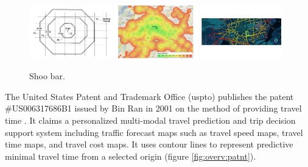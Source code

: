     \begin{figure}[ht]
      {\includegraphics[width=0.32\textwidth]{./img/overv-patnt.png}}
      \hfill
      {\includegraphics[width=0.32\textwidth]{./img/overv-berln.png}}
      \hfill
      {\includegraphics[width=0.32\textwidth]{./img/overv-potsd.png}}
      \caption{Shoo bar.}
      \label{fig:overv:2}
    \end{figure}

    The United States Patent and Trademark Office (\acrshort{uspto}) publishes
    the patent \#US006317686B1 issued by Bin Ran in 2001 on the method of
    providing travel time \cite{ran2001method}. It claims a personalized
    multi-modal travel prediction and trip decision support system including
    traffic forecast maps such as travel speed maps, travel time maps, and
    travel cost maps. It uses contour lines to represent predictive minimal
    travel time from a selected origin (figure \ref{fig:overv:patnt}).\par



